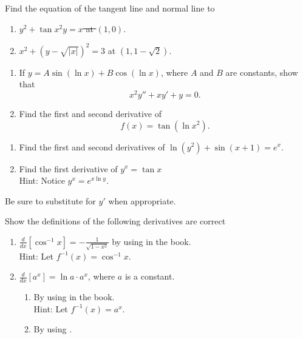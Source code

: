 \documentclass[10pt,letterpaper,unboxed]{hwset}
\begin{document}
\begin{problem}[1.]
	Find the equation of the tangent line and normal line to  
	\begin{enumerate}
		\item \sout{$y^2 + \tan x^2y = x$ at $(1,0)$}.
		\item $x^2+\left(y-\sqrt{|x|}\right)^2=3$ at $(1,1-\sqrt{2})$. 
	\end{enumerate}
\end{problem}

\begin{problem}[2.]
	\begin{enumerate}
		\item If $y=A \sin(\ln x) + B\cos(\ln x)$, where $A$ and $B$ are constants,
			show that 
			\begin{equation*}
				x^2y''+xy'+y=0.
			\end{equation*}
		\item Find the first and second derivative of 
			\begin{equation*}
				f(x) = \tan (\ln x^2).
			\end{equation*}
	\end{enumerate}
\end{problem}

\begin{problem}[3.]
 \begin{enumerate}
 		\item Find the first and second derivatives of $\ln (y^2) + \sin (x+1) =
			e^x$. 
		\item Find the first derivative of $y^x = \tan x$ \\
			Hint: Notice $y^x = e^{x \ln y}$.
 \end{enumerate}
 Be sure to substitute for $y'$ when appropriate.
\end{problem}

\begin{problem}[4.]
	Show the definitions of the following derivatives are correct
	\begin{enumerate}
		\item $\frac{d}{dx}\left[\cos^{-1} x\right] = -\frac{1}{\sqrt{1-x^2}}$ by
			using  in the book.\\
			Hint: Let $f^{-1}(x)=\cos^{-1} x$.
		\item $\frac{d}{dx}\left[a^x\right] = \ln a \cdot a^x$, where $a$ is a
			constant. \\ 
			\begin{enumerate}
				\item By using  in the book. \\
					Hint: Let $f^{-1}(x)=a^x$.
				\item By using .
			\end{enumerate}
	\end{enumerate}
\end{problem}
\end{document}
